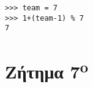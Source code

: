 \documentclass[a4paper,10pt]{article} \usepackage{anysize}
\begin{document}


\begin{verbatim}
>>> team = 7
>>> 1+(team-1) % 7
7
\end{verbatim}
\section*{Ζήτημα 7\textsuperscript{o}}
\inputminted[linenos,obeytabs,frame=leftline,fontsize=\footnotesize]{oldasm}{files/fanaria.8085}
\section*{} 
\end{document}

